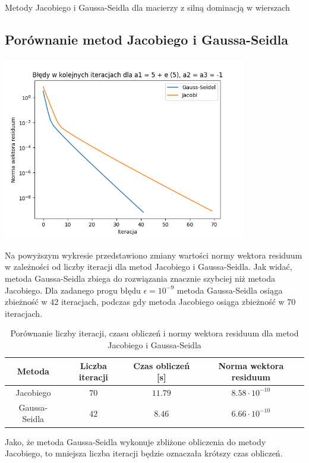 \documentclass{article}
\begin{document}
\begin{section}{Metody Jacobiego i Gaussa-Seidla dla macierzy z silną dominacją w wierszach}
    \subsection{Porównanie metod Jacobiego i Gaussa-Seidla}
    \begin{center}
        \includegraphics[width=0.8\textwidth]{bledy_zbiezne.png}
    \end{center}
    Na powyższym wykresie przedstawiono zmiany wartości normy wektora residuum w zależności od liczby iteracji
    dla metod Jacobiego i Gaussa-Seidla. Jak widać, metoda Gaussa-Seidla zbiega do rozwiązania znacznie szybciej
    niż metoda Jacobiego. Dla zadanego progu błędu $\epsilon = 10^{-9}$ metoda Gaussa-Seidla osiąga zbieżność w 42
    iteracjach, podczas gdy metoda Jacobiego osiąga zbieżność w 70 iteracjach.
    \begin{table}[H]
        \centering
        \begin{tabular}{|c|c|c|c|}
            \hline
            Metoda & Liczba iteracji & Czas obliczeń [s] & Norma wektora residuum \\
            \hline
            Jacobiego & $70$ & $11.79$ & $8.58\cdot10^{-10}$ \\
            Gaussa-Seidla & $42$ & $8.46$ & $6.66\cdot10^{-10}$ \\
            \hline
        \end{tabular}
        \caption{Porównanie liczby iteracji, czasu obliczeń i normy wektora residuum dla metod Jacobiego i Gaussa-Seidla}
    \end{table}
    Jako, że metoda Gaussa-Seidla wykonuje zbliżone obliczenia do metody Jacobiego, to mniejsza liczba iteracji 
    będzie oznaczała krótszy czas obliczeń.
\end{section}
\end{document}
